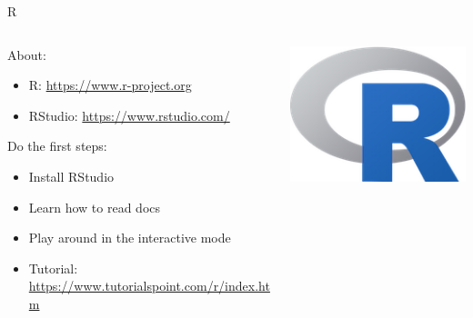 \begin{frame}{R}
    \begin{columns}
        \begin{column}{0.7\textwidth}
            About:
            \begin{itemize}
                \item R: \url{https://www.r-project.org}
                \item RStudio: \url{https://www.rstudio.com/}
            \end{itemize}

            Do the first steps:  
            \begin{itemize}
                \item Install RStudio
                \item Learn how to read docs
                \item Play around in the interactive mode
                \item Tutorial:\\ \url{https://www.tutorialspoint.com/r/index.htm}
            \end{itemize}
        \end{column}
        \begin{column}{0.3\textwidth}
            \includegraphics[width=\linewidth]{gfx/web/Rlogo}
        \end{column}
    \end{columns}
\end{frame}

